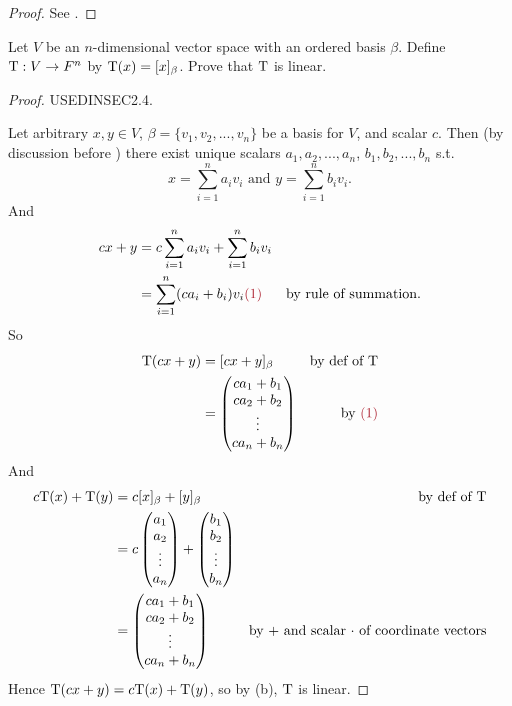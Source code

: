 \begin{proof}
See .
\end{proof}

\begin{exercise} \label{exercise 2.2.8}
Let \(V\) be an \(n\)-dimensional vector space with an ordered basis \(\beta\).
Define \(\mathrm{T} : V \to F^n\) by \(\mathrm{T}(x) = [x]_{\beta}\).
Prove that \(\mathrm{T}\) is linear.
\end{exercise}

\begin{proof}
USEDINSEC2.4.

Let arbitrary \(x, y \in V\), \(\beta = \{ v_1, v_2, ..., v_n \}\) be a basis for \(V\), and scalar \(c\).
Then (by discussion before ) there exist unique scalars \(a_1, a_2, ..., a_n\), \(b_1, b_2, ..., b_n\) s.t.
\[
    x = \sum_{i = 1}^n a_i v_i \text{ and } y = \sum_{i = 1}^n b_i v_i.
\]
And
\begin{align*}
    cx + y & = c\sum_{i = 1}^n a_i v_i + \sum_{i = 1}^n b_i v_i \\
           & = \sum_{i = 1}^n (ca_i + b_i) v_i \MAROON{(1)} & \text{by rule of summation}.
\end{align*}
So
\begin{align*}
    \T(cx + y) & = [cx + y]_{\beta} & \text{by def of \(\T\)} \\
               & = \begin{pmatrix} ca_1 + b_1 \\ ca_2 + b_2 \\ \vdots \\ ca_n + b_n \end{pmatrix} & \text{by \MAROON{(1)}}
\end{align*}
And
\begin{align*}
    c\mathrm{T}(x) + \mathrm{T}(y) & = c[x]_{\beta} + [y]_{\beta} & \text{by def of \(\mathrm{T}\)} \\
                   & = c \begin{pmatrix}
                        a_1 \\ a_2 \\ \vdots \\ a_n
                    \end{pmatrix}
                    + \begin{pmatrix}
                        b_1 \\ b_2 \\ \vdots \\ b_n
                    \end{pmatrix} \\
                   & = \begin{pmatrix} ca_1 + b_1 \\ ca_2 + b_2 \\ \vdots \\ ca_n + b_n \end{pmatrix} & \text{by \(+\) and scalar \(\cdot\) of coordinate vectors}
\end{align*}
Hence \(\mathrm{T}(cx + y) = c\mathrm{T}(x) + \mathrm{T}(y)\), so by (b), \(\mathrm{T}\) is linear.
\end{proof}

